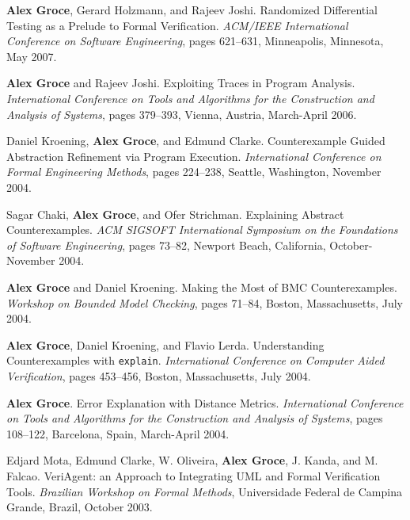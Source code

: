 \documentclass[ComputerScience]{vita}
\begin{document}
\begin{vita}
\begin{Refereed Conference and Workshop Publications}
\item
{\bf Alex Groce}, Gerard Holzmann, and Rajeev Joshi.
\newblock Randomized Differential Testing as a Prelude to Formal Verification.
\newblock \emph{ACM/IEEE International Conference on Software Engineering}, pages 621--631, Minneapolis, Minnesota, May 2007.

\item
{\bf Alex Groce} and Rajeev Joshi.
\newblock Exploiting Traces in Program Analysis.
\newblock \emph{International Conference on Tools and Algorithms for the Construction and Analysis of Systems}, pages 379--393, Vienna, Austria, March-April 2006.

\item
Daniel Kroening, {\bf Alex Groce}, and Edmund Clarke.
\newblock Counterexample Guided Abstraction Refinement via Program Execution.
\newblock \emph{International Conference on
   Formal Engineering Methods},  pages 224--238, Seattle, Washington, November 2004.

\item
Sagar Chaki, {\bf Alex Groce}, and Ofer Strichman.
\newblock Explaining Abstract Counterexamples.
\newblock \emph{ACM SIGSOFT International Symposium on the Foundations of Software Engineering},  pages 73--82, Newport Beach, California, October-November 2004.

\item
{\bf Alex Groce} and Daniel Kroening.
\newblock Making the Most of BMC Counterexamples.
\newblock \emph{Workshop on Bounded Model Checking},  pages 71--84, Boston, Massachusetts, July 2004.

\item
{\bf Alex Groce}, Daniel Kroening, and Flavio Lerda.
\newblock Understanding Counterexamples with {\tt explain}.
\newblock \emph{International Conference on Computer Aided Verification},  pages 453--456, Boston, Massachusetts, July 2004.

\item
{\bf Alex Groce}.
\newblock Error Explanation with Distance Metrics.
\newblock \emph{International Conference on Tools and Algorithms for the Construction and Analysis of Systems}, pages 108--122, Barcelona, Spain, March-April 2004.


\item
Edjard Mota, Edmund Clarke, W. Oliveira, {\bf Alex Groce}, J. Kanda, and M. Falcao.
\newblock VeriAgent: an Approach to Integrating UML and Formal Verification Tools.
\newblock \emph{Brazilian Workshop on Formal Methods}, Universidade Federal de Campina Grande, Brazil, October 2003.


\end{Refereed Conference and Workshop Publications}
\end{vita}
\end{document}
